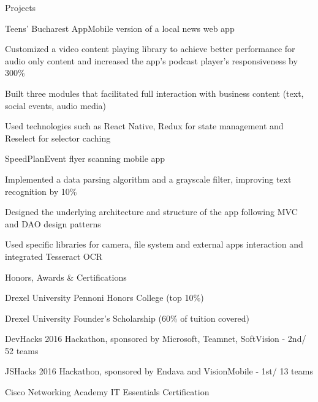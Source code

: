 \documentclass{resume} %
\begin{document}
\begin{rSection}{Projects}

\begin{rSubsection}{Teens' Bucharest App}{Mobile version of a local news web app}{}{}
\item Customized a video content playing library to achieve better performance for audio only content and increased the app's podcast player's responsiveness by 300\%
\item Built three modules that facilitated full interaction with business content (text, social events, audio media)
\item Used technologies such as React Native, Redux for state management and Reselect for selector caching
\end{rSubsection}

\begin{rSubsection}{SpeedPlan}{Event flyer scanning mobile app}{}{}
\item Implemented a data parsing algorithm and a grayscale filter, improving text recognition by 10\%
\item Designed the underlying architecture and structure of the app following MVC and DAO design patterns
\item Used specific libraries for camera, file system and external apps interaction and integrated Tesseract OCR
\end{rSubsection}

\end{rSection}


\begin{rSection}{Honors, Awards \& Certifications}
\begin{rSubsection}{}{}{}{}
\item Drexel University Pennoni Honors College (top 10\%)
\item Drexel University Founder’s Scholarship (60\% of tuition covered)
\item DevHacks 2016 Hackathon, sponsored by Microsoft, Teamnet, SoftVision - 2nd/ 52 teams
\item JSHacks 2016 Hackathon, sponsored by Endava and VisionMobile - 1st/ 13 teams
\item Cisco Networking Academy IT Essentials Certification
\end{rSubsection}
\end{rSection}

\end{document}
